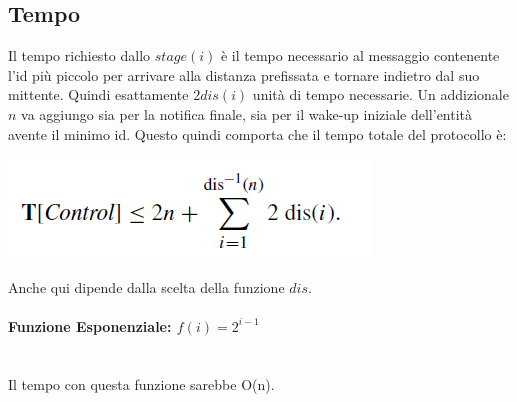\subsection{Tempo}
Il tempo richiesto dallo $stage(i)$ è il tempo necessario al messaggio
contenente l'id più piccolo per arrivare alla distanza prefissata e tornare
indietro dal suo mittente. Quindi esattamente $2dis(i)$ unità di tempo
necessarie. Un addizionale $n$ va aggiungo sia per la notifica finale, sia per
il wake-up iniziale dell'entità avente il minimo id. Questo quindi comporta che
il tempo totale del protocollo è:
\begin{center}
    \includegraphics[scale=0.6]{capitoli/leader-election/imgs/ee.png}
\end{center}
Anche qui dipende dalla scelta della funzione $dis$.

\paragraph{Funzione Esponenziale: $f(i) = 2^{i-1}$}\ \\
Il tempo con questa funzione sarebbe O(n).


